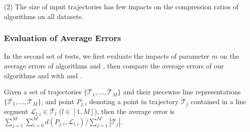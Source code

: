\ni(2) The size of input trajectories has few impacts on the compression ratios of \lsa algorithms on all datasets.





\subsubsection{Evaluation of Average Errors}
In the second set of tests, we first evaluate the impacts of parameter $m$ on the average errors of algorithms \cist and \cista, then compare the average errors of our algorithms \cist and \cista with \dps and \squishe.

Given a set of trajectories $\{\dddot{\mathcal{T}_1}, \ldots, \dddot{\mathcal{T}}_M\}$ and their piecewise line representations $\{\overline{\mathcal{T}_1}, \ldots, \overline{\mathcal{T}}_M\}$, and point $P_{j,i}$ denoting
a point in trajectory $\dddot{\mathcal{T}}_j$ contained in a line segment $\mathcal{L}_{l,i}\in\overline{\mathcal{T}_l}$ ($l\in[1,M]$),
then the average error is $\sum_{j=1}^{M}\sum_{i=0}^{M} d(P_{j,i},
\mathcal{L}_{l,i})/\sum_{j=1}^{M}{|\dddot{\mathcal{T}}_j |}$.




